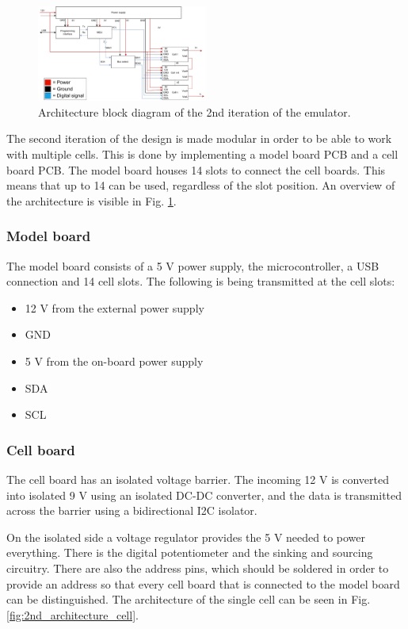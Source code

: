 \begin{figure}[h]
    \centering
    \includegraphics[width=0.5\textwidth]{architecture_2nd_iteration.pdf}
    \caption{Architecture block diagram of the 2nd iteration of the emulator.}
    \label{fig:2nd_architecture}
\end{figure}

The second iteration of the design is made modular in order to be able to work
 with multiple cells. This is done by implementing a model board
PCB and a cell board PCB. The model board houses 14 slots to connect the cell boards.
This means that up to 14 can be used, regardless 
of the slot position. An overview of the architecture is visible in 
Fig. \ref{fig:2nd_architecture}.

    \subsubsection{Model board}
    The model board consists of a 5 V power supply, the microcontroller, a USB 
    connection and 14 cell slots. The following is being transmitted at the
    cell slots:

    \begin{itemize}
        \item 12 V from the external power supply
        \item GND
        \item 5 V from the on-board power supply
        \item SDA
        \item SCL
    \end{itemize}

    \subsubsection{Cell board}
    The cell board has an isolated voltage barrier. The incoming 12 V is 
    converted into isolated 9 V using an isolated DC-DC converter, and the data is
    transmitted across the barrier using a bidirectional I2C isolator.

    On the isolated side a voltage regulator provides 
    the 5 V needed to power everything. There is the digital potentiometer
    and the sinking and sourcing circuitry. There are also the address pins, which
    should be soldered in order to provide an address so that every cell board that 
    is connected to the model board can be distinguished.
    The architecture of the single cell can be seen in Fig. 
    \ref{fig:2nd_architecture_cell}.

